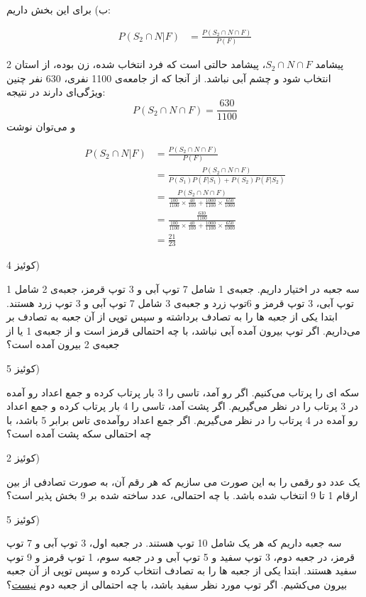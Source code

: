 \documentclass[10pt,letterpaper]{report}
\newcommand{\eqn}[1]{
\[\begin{split}
#1
\end{split}\]
}
\begin{document}
ب) برای این بخش داریم:

\eqn{
P(S_2\cap N|F)&=
\frac{P(S_2\cap N\cap F)}{P(F)}
}
پیشامد $S_2\cap N\cap F$، پیشامد حالتی است که فرد انتخاب شده، زن بوده، از استان 2 انتخاب شود و چشم آبی نباشد. از آنجا که از جامعه‌ی 1100 نفری، 630 نفر چنین ویژگی‌ای دارند در نتیجه:
$$
P(S_2\cap N\cap F)=\frac{630}{1100}
$$
و می‌توان نوشت
\eqn{
P(S_2\cap N|F)&=
\frac{P(S_2\cap N\cap F)}{P(F)}
\\&=
\frac{P(S_2\cap N\cap F)}{P(S_1)P(F|S_1)+P(S_2)P(F|S_2)}
\\&=
\frac{P(S_2\cap N\cap F)}{
\frac{100}{1100}\times \frac{40}{100}+\frac{1000}{1100}\times \frac{650}{1000}
}
\\&=
\frac{\frac{630}{1100}}{
\frac{100}{1100}\times \frac{40}{100}+\frac{1000}{1100}\times \frac{650}{1000}
}
\\&=
\frac{21}{23}
}

کوئیز 4)

سه جعبه در اختیار داریم. جعبه‌ی 1 شامل 7 توپ آبی و 3 توپ قرمز، جعبه‌ی 2 شامل 1 توپ آبی، 3 توپ قرمز و 6توپ زرد و جعبه‌ی 3 شامل 7 توپ آبی و 3 توپ زرد هستند. ابتدا یکی از جعبه ها را به تصادف برداشته و سپس توپی از آن جعبه به تصادف بر می‌داریم. اگر توپ بیرون آمده آبی نباشد، با چه احتمالی قرمز است و از جعبه‌ی 1 یا از جعبه‌ی 2 بیرون آمده است؟

کوئیز 5)

سکه ای را پرتاب می‌کنیم. اگر رو آمد، تاسی را 3 بار پرتاب کرده و جمع اعداد رو آمده در 3 پرتاب را در نظر می‌گیریم. اگر پشت آمد، تاسی را 4 بار پرتاب کرده و جمع اعداد رو آمده در 4 پرتاب را در نظر می‌گیریم. اگر جمع اعداد روآمده‌ی تاس برابر 5 باشد، با چه احتمالی سکه پشت آمده است؟

کوئیز 2)

یک عدد دو رقمی را به این صورت می سازیم که هر رقم آن، به صورت تصادفی از بین ارقام 1 تا 9 انتخاب شده باشد. با چه احتمالی، عدد ساخته شده بر 9 بخش پذیر است؟

کوئیز 5)

سه جعبه داریم که هر یک شامل 10 توپ هستند. در جعبه اول، 3 توپ آبی و 7 توپ قرمز، در جعبه دوم، 3 توپ سفید و 5 توپ آبی و در جعبه سوم، 1 توپ قرمز و 9 توپ سفید هستند. ابتدا یکی از جعبه ها را به تصادف انتخاب کرده و سپس توپی از آن جعبه بیرون می‌کشیم. اگر توپ مورد نظر سفید باشد، با چه احتمالی از جعبه دوم \underline{نیست}؟




\end{document}

